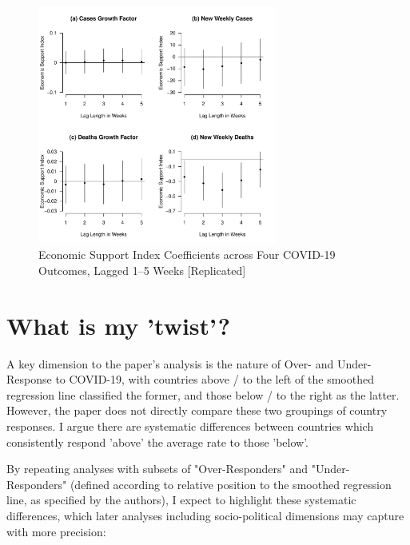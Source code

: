 \documentclass[12pt,letterpaper]{article}
\begin{document}
\begin{enumerate}
\begin{itemize}
			\begin{figure}[!h]
				\centering
				\includegraphics[width=0.7\textwidth]{esi.pdf}
				\caption{Economic Support Index Coefficients across Four COVID-19 Outcomes, Lagged 1–5 Weeks [Replicated]}
				\label{fig:esi}
			\end{figure}
		\end{itemize}
	\end{enumerate}
	
	\section*{What is my 'twist'?}
	
	\vspace{.25cm}	
	
	\noindent A key dimension to the paper's analysis is the nature of Over- and Under-Response to COVID-19, with countries above / to the left of the smoothed regression line classified the former, and those below / to the right as the latter. However, the paper does not directly compare these two groupings of country responses. I argue there are systematic differences between countries which consistently respond 'above' the average rate to those 'below'.
	
	\vspace{.25cm}	
	
	\noindent By repeating analyses with subsets of "Over-Responders" and "Under-Responders" (defined according to relative position to the smoothed regression line, as specified by the authors), I expect to highlight these systematic differences, which later analyses including socio-political dimensions may capture with more precision:
	
\end{document}
